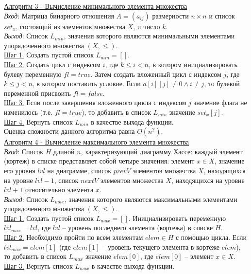 \documentclass[bachelor, och, labwork]{shiza}
\begin{document}
        \underline{Алгоритм 3 - Вычисление минимального элемента множества} \\
            \textit{Вход}: Матрица бинарного отношения $A = (a_{ij})$ размерности $n \times n$ и список $set_x$, состоящий из элементов
            множества $X$, и  число $k$.\\            
            \textit{Выход}: Список $L_{min}$, значения которого являются минимальными элементами упорядоченного множества $(X, \leq)$.\\
            \underline{Шаг 1.} Создать пустой список $L_{min} = []$.\\
            \underline{Шаг 2.} Создать цикл с индексом $i$, где $k \leq i < n$, в котором инициализировать булеву переменную $fl = true$.
            Затем создать вложенный цикл с индексом $j$, где $k \leq j < n$, в котором поставить условие. Если $a[i][j] \neq 0 \wedge i \neq j$,
            то булевой переменной присвоить $fl = false$. \\
            \underline{Шаг 3.} Если после завершения вложенного цикла с индексом $j$ значение флага не изменилось (т.е. $fl = true$), то
            добавить в список $L_{min}$ значение $set_x[j]$.\\
            \underline{Шаг 4.} Вернуть список $L_{min}$ в качестве выхода функции.\\

            Оценка сложности данного алгоритма равна $O(n^2)$.\\

        \underline{Алгоритм 4 - Вычисление максимального элемента множества}\\
            \textit{Вход}: Список $H$ длиной $n$, характеризующий диаграмму Хассе: каждый элемент (кортеж) в списке представляет
            собой четыре значения: элемент $x \in X$, значение его уровня $lvl$ на диаграмме, список $prevV$ элементов множества
            $X$, находящихся на уровне $lvl - 1$, список $nextV$ элементов множества $X$, находящихся на уровне $lvl + 1$ относительно
            элемента $x$. \\       
            \textit{Выход}: Список $L_{max}$, значения которого являются максимальными элементами упорядоченного множества $(X, \leq)$.\\
            \underline{Шаг 1.} Создать пустой список $L_{max} = []$. Инициализировать переменную $lvl_{max} = lvl$, где $lvl$ -- уровень
            последнего элемента (кортежа) в списке $H$.\\
            \underline{Шаг 2.} Необходимо пройти по всем элементам $elem \in H$ с помощью цикла. Если $lvl_{max} = elem[1]$ (где $elem[1]$ --
            уровень текущего элемента в кортеже $elem$), то добавить в список $L_{max}$ значение $elem[0]$, 
            где $elem[0]$ -- элемент $x \in X$.\\ 
            \underline{Шаг 3.} Вернуть список $L_{max}$ в качестве выхода функции.\\
\end{document}
